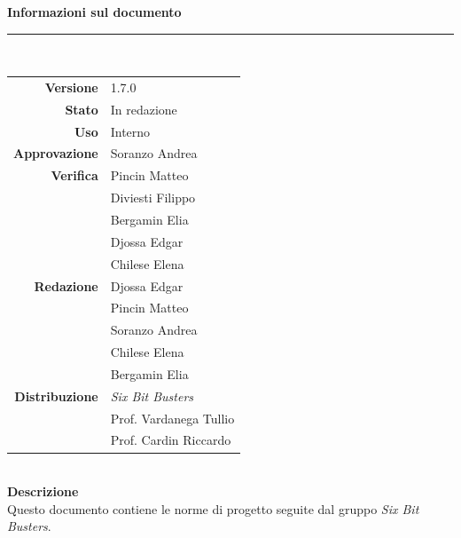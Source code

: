 \begin{titlepage}
\begin{center}
	\large \textbf{Informazioni sul documento} \\
	\rule{0.6\textwidth}{0.4pt}
	\\[0.5cm]
	\begin{tabular}{r|l}
		\textbf{Versione} & 1.7.0\\
		\textbf{Stato} & In redazione\\
		\textbf{Uso} & Interno\\                         
		\textbf{Approvazione} & Soranzo Andrea\\                      
		\textbf{Verifica} & Pincin Matteo\\ & Diviesti Filippo\\ & Bergamin Elia\\ & Djossa Edgar\\ &Chilese Elena \\                     
		\textbf{Redazione} & Djossa Edgar \\ & Pincin Matteo \\ & Soranzo Andrea\\ & Chilese Elena \\ & Bergamin Elia\\
		\textbf{Distribuzione} & \textit{Six Bit Busters} \\ & Prof. Vardanega Tullio \\ & Prof. Cardin Riccardo
	\end{tabular}	
	\\[0.8cm]

	\large \textbf{Descrizione} \\
	Questo documento contiene le norme di progetto seguite dal gruppo \textit{Six Bit Busters}.
	
	
	
	\end{center}
\end{titlepage}
